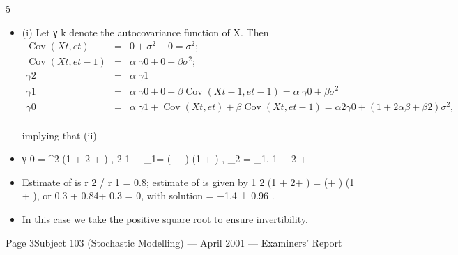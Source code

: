 \documentclass[a4paper,12pt]{article}
\begin{document}

\newpage
5
\begin{itemize}
    \item 

(i) Let γ k denote the autocovariance function of X. Then
\begin{eqnarray*}
\operatorname{Cov}(X t , e t ) &=& 0 + \sigma^2 + 0 = \sigma^2 ;\\
\operatorname{Cov}(X t , e t − 1 ) &=& \alpha\; \gamma 0 + 0 + \beta\sigma^2 ;\\
γ 2 &=& \alpha\; \gamma 1\\
γ 1 &=& \alpha\; \gamma 0 + 0 + \beta \operatorname{Cov}(X t − 1 , e t − 1 ) = \alpha\; \gamma 0 + \beta\sigma^2\\
γ 0 &=& \alpha\; \gamma 1 + \operatorname{Cov}(X t , e t ) + \beta \operatorname{Cov}(X t , e t − 1 ) = \alpha 2 γ 0 + (1 + 2\alpha\beta + \beta 2 ) \sigma^2 ,\\
\end{eqnarray*}

implying that
(ii)
    \item γ 0 = \sigma^2
(1 + 2 \alpha\beta +  ) ,
2
1 −\alpha
\rho_1= ( \alpha + \beta ) (1 + \alpha\beta )
, \rho_2 = \alpha\rho_1.
1 + 2 \alpha\beta + 
\item Estimate of \alpha is r 2 / r 1 = 0.8; estimate of \beta is given by
1
2
(1 + 2\alpha\beta +  ) = (\alpha + \beta) (1 + \alpha\beta), or 0.3 + 0.84\beta + 0.3 = 0, with solution
\beta = −1.4 ±
0.96 .
\item In this case we take the positive square root to ensure invertibility.
\end{itemize}
Page 3Subject 103 (Stochastic Modelling) — April 2001 — Examiners’ Report
\end{document}
